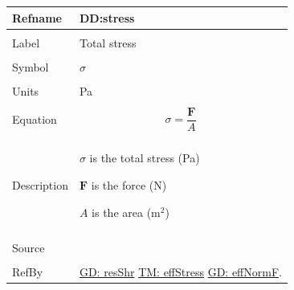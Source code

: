 \documentclass[12pt]{article}
\begin{document}
\noindent \begin{minipage}{\textwidth}
\begin{tabular}{p{} p{}}
\toprule \textbf{Refname} & \textbf{DD:stress}
\label{DD:stress}
\\ \midrule \\
Label & Total stress
\\ \midrule \\
Symbol & $σ$
\\ \midrule \\
Units & Pa
\\ \midrule \\
Equation & \begin{displaymath}
           σ=\frac{\mathbf{F}}{A}
           \end{displaymath}
\\ \midrule \\
Description & \begin{symbDescription}
              \item{$σ$ is the total stress (Pa)}
              \item{$\mathbf{F}$ is the force (N)}
              \item{$A$ is the area ($\text{m}^{2}$)}
              \end{symbDescription}
\\ \midrule \\
Source & \cite{huston2008}
\\ \midrule \\
RefBy & \hyperref[GD:resShr]{GD: resShr} \hyperref[TM:effStress]{TM: effStress} \hyperref[GD:effNormF]{GD: effNormF}.
\\ \bottomrule \end{tabular}
\end{minipage}
\par~
\end{document}
